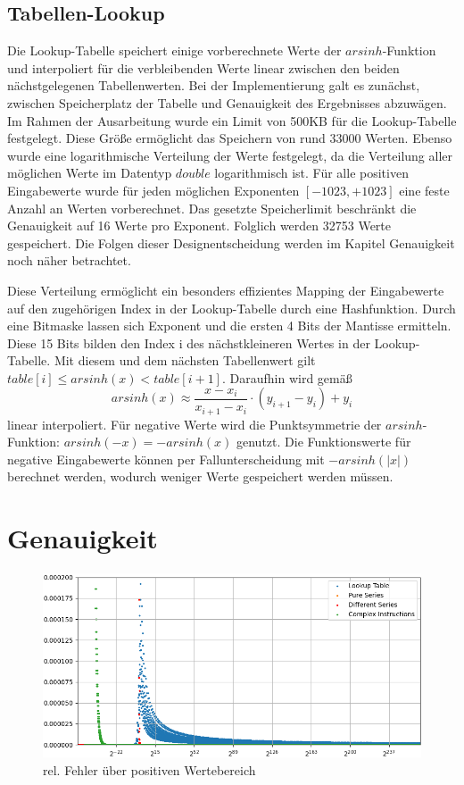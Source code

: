 \documentclass[course=erap] {aspdoc}
\begin{document}
    \subsection{Tabellen-Lookup}
    Die Lookup-Tabelle speichert einige vorberechnete Werte der $arsinh$-Funktion und interpoliert für die verbleibenden Werte linear zwischen den beiden nächstgelegenen Tabellenwerten.
    Bei der Implementierung galt es zunächst, zwischen Speicherplatz der Tabelle und Genauigkeit des Ergebnisses abzuwägen.
    Im Rahmen der Ausarbeitung wurde ein Limit von 500KB für die Lookup-Tabelle festgelegt.
    Diese Größe ermöglicht das Speichern von rund 33000 Werten.
    Ebenso wurde eine logarithmische Verteilung der Werte festgelegt, da die Verteilung aller möglichen Werte im Datentyp $double$ logarithmisch ist.
    Für alle positiven Eingabewerte wurde für jeden möglichen Exponenten $[-1023, +1023]$ eine feste Anzahl an Werten vorberechnet.
    Das gesetzte Speicherlimit beschränkt die Genauigkeit auf 16 Werte pro Exponent.
    Folglich werden 32753 Werte gespeichert.
    Die Folgen dieser Designentscheidung werden im Kapitel Genauigkeit noch näher betrachtet.

    Diese Verteilung ermöglicht ein besonders effizientes Mapping der Eingabewerte auf den zugehörigen Index in der Lookup-Tabelle durch eine Hashfunktion.
    Durch eine Bitmaske lassen sich Exponent und die ersten 4 Bits der Mantisse ermitteln.
    Diese 15 Bits bilden den Index i des nächstkleineren Wertes in der Lookup-Tabelle.
    Mit diesem und dem nächsten Tabellenwert gilt $table[i] \leq arsinh(x) < table[i+1]$.
    Daraufhin wird gemäß
    \[
        arsinh(x) \approx \frac{x-x_i}{x_{i+1} - x_i}\cdot (y_{i+1}-y_i) + y_i
    \]
    linear interpoliert.
    Für negative Werte wird die Punktsymmetrie der $arsinh$-Funktion: $arsinh(-x) = -arsinh(x)$ genutzt.
    Die Funktionswerte für negative Eingabewerte können per Fallunterscheidung mit $-arsinh(|x|)$ berechnet werden, wodurch weniger Werte gespeichert werden müssen.


    \section{Genauigkeit}\label{sec:genauigkeit}

    \begin{figure}[h]
        \centering
        \includegraphics[width=12cm,height=5.5cm]{images/Figure3}
        \caption{rel. Fehler über positiven Wertebereich}
    \end{figure}
\end{document}
